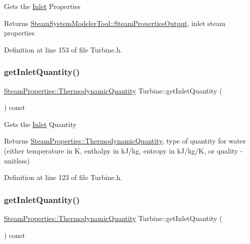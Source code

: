 Gets the \hyperlink{class_inlet}{Inlet} Properties

\begin{DoxyReturn}{Returns}
\hyperlink{struct_steam_system_modeler_tool_1_1_steam_properties_output}{Steam\+System\+Modeler\+Tool\+::\+Steam\+Properties\+Output}, inlet steam properties 
\end{DoxyReturn}


Definition at line 153 of file Turbine.\+h.

\mbox{\label{class_turbine_ac9e91d9539cea5cd1e0037c397c28c78}} 
\subsubsection{\texorpdfstring{get\+Inlet\+Quantity()}{getInletQuantity()}\hspace{0.1cm}{\footnotesize\ttfamily [1/3]}}
{\footnotesize\ttfamily \hyperlink{class_steam_properties_ae0294bedf7d178c2d8fb6aed0f62fbff}{Steam\+Properties\+::\+Thermodynamic\+Quantity} Turbine\+::get\+Inlet\+Quantity (\begin{DoxyParamCaption}{ }\end{DoxyParamCaption}) const\hspace{0.3cm}{\ttfamily [inline]}}

Gets the \hyperlink{class_inlet}{Inlet} Quantity

\begin{DoxyReturn}{Returns}
\hyperlink{class_steam_properties_ae0294bedf7d178c2d8fb6aed0f62fbff}{Steam\+Properties\+::\+Thermodynamic\+Quantity}, type of quantity for water (either temperature in K, enthalpy in k\+J/kg, entropy in k\+J/kg/K, or quality -\/ unitless) 
\end{DoxyReturn}


Definition at line 123 of file Turbine.\+h.

\mbox{\label{class_turbine_ac9e91d9539cea5cd1e0037c397c28c78}} 
\subsubsection{\texorpdfstring{get\+Inlet\+Quantity()}{getInletQuantity()}\hspace{0.1cm}{\footnotesize\ttfamily [2/3]}}
{\footnotesize\ttfamily \hyperlink{class_steam_properties_ae0294bedf7d178c2d8fb6aed0f62fbff}{Steam\+Properties\+::\+Thermodynamic\+Quantity} Turbine\+::get\+Inlet\+Quantity (\begin{DoxyParamCaption}{ }\end{DoxyParamCaption}) const\hspace{0.3cm}{\ttfamily [inline]}}


